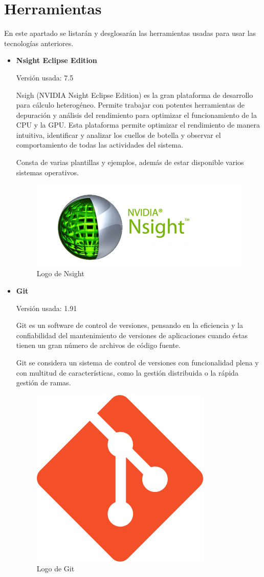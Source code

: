	
	

\newpage
\section{Herramientas}

En este apartado se listarán y desglosarán las herramientas usadas para usar las tecnologías anteriores.


\begin{itemize}
	\item \textbf{Nsight Eclipse Edition}
	
	Versión usada: 7.5
		
	Nsigh (NVIDIA Nsight Eclipse Edition) \cite{nsight} es la gran plataforma de desarrollo para cálculo heterogéneo. Permite trabajar con potentes herramientas de depuración y análisis del rendimiento para optimizar el funcionamiento de la CPU y la GPU. Esta plataforma permite optimizar el rendimiento de manera intuitiva, identificar y analizar los cuellos de botella y observar el comportamiento de todas las actividades del sistema.

	Consta de varias plantillas y ejemplos, además de estar disponible varios sistemas operativos.
 
	\bigskip
	\begin{figure}[h]
		\centering
		\includegraphics[width=0.5\linewidth]{../images/nsightlogo}
		\caption[Logo de Nsight]{Logo de Nsight}
		\label{fig:nsightlogo}
	\end{figure}
	
			
	\item \textbf{Git}
			
		Versión usada: 1.91
		
	Git \cite{git} es un software de control de versiones, pensando en la eficiencia y la confiabilidad del mantenimiento de versiones de aplicaciones cuando éstas tienen un gran número de archivos de código fuente. 

	Git se considera un sistema de control de versiones con funcionalidad plena y con multitud de características, como la gestión distribuida o la rápida gestión de ramas. 

	\bigskip
	\begin{figure}[h]
		\centering
		\includegraphics[width=0.3\linewidth]{../images/gitlogo}
		\caption[Logo de Git]{Logo de Git}
		\label{fig:gitlogo}
	\end{figure}
				

\end{itemize}
